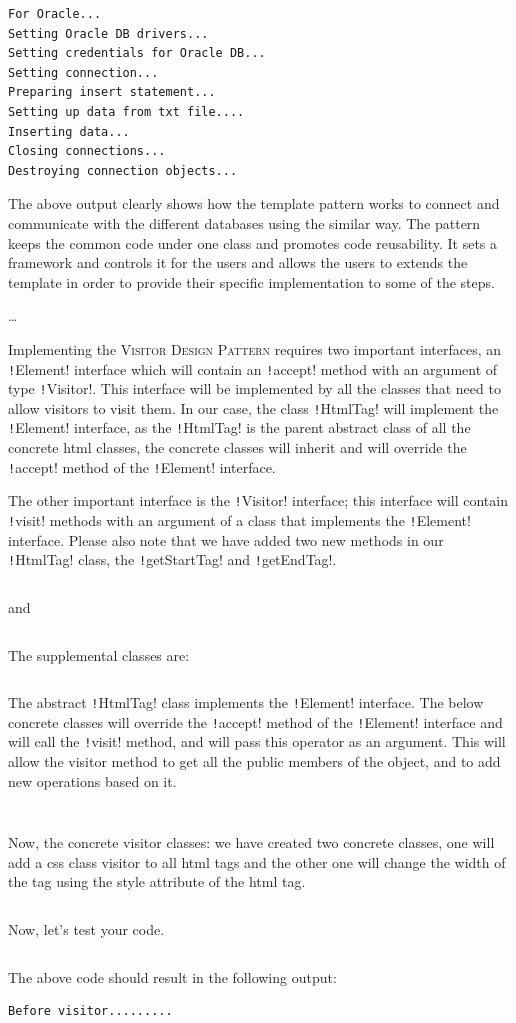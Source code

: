 \documentclass[12pt,a4paper,answers]{exam}
\newcommand{\code}{/Users/keith/Documents/Courses/sdp/repo/worksheets/dp-five/scala/src}
\begin{document}
\begin{questions}
\begin{Verbatim}
For Oracle...
Setting Oracle DB drivers...
Setting credentials for Oracle DB...
Setting connection...
Preparing insert statement...
Setting up data from txt file....
Inserting data...
Closing connections...
Destroying connection objects...	
\end{Verbatim}
The above output clearly shows how the template pattern works to connect and communicate 
with the different databases using the similar way. The pattern keeps the common code under 
one class and promotes code reusability. It sets a framework and controls it for the users 
and allows the users to extends the template in order to provide their specific 
implementation to some of the steps.
\begin{solution}
	\ldots
\end{solution}

\question
Implementing the \textsc{Visitor Design Pattern} requires two important interfaces, 
an \texttt!Element! interface which will contain an 
\texttt!accept! method with an argument of type 
\texttt!Visitor!. This interface will be implemented by all the classes that need 
to allow visitors to visit them. In our case, the class \texttt!HtmlTag! 
will implement the \texttt!Element! interface, as the 
\texttt!HtmlTag! is the parent abstract class of all the concrete html classes, 
the concrete classes will inherit and will override the \texttt!accept! 
method of the \texttt!Element! interface.

The other important interface is the \texttt!Visitor! interface; this 
interface will contain \texttt!visit! methods with an argument of a 
class that implements the \texttt!Element! interface. 
Please also note that we have added two new methods in our 
\texttt!HtmlTag! class, the \texttt!getStartTag! and
\texttt!getEndTag!. 
\inputminted{scala}{\code/visitor/Element.scala}
and
\inputminted{scala}{\code/visitor/Visitor.scala}
The supplemental classes are:
\inputminted{scala}{\code/visitor/HtmlTag.scala}
The abstract \texttt!HtmlTag! class implements the \texttt!Element!
interface. The below concrete classes will override the 
\texttt!accept! method of the \texttt!Element! interface 
and will call the \texttt!visit! method, and will pass this operator as an argument.
This will allow the visitor method to get all the public members of the object, 
and to add new operations based on it.
\inputminted{scala}{\code/visitor/HtmlParentElement.scala}
\inputminted{scala}{\code/visitor/HtmlElement.scala}
Now, the concrete visitor classes: we have created two concrete classes, 
one will add a css class visitor to all html tags and the other one will 
change the width of the tag using the style attribute of the html tag.
\inputminted{scala}{\code/visitor/CssClassVisitor.scala}
Now, let's test your code.
\inputminted{scala}{\code/visitor/TestVisitorPattern.scala}
The above code should result in the following output:
\begin{Verbatim}
Before visitor.........


\end{Verbatim}
\end{questions}
\end{document}
